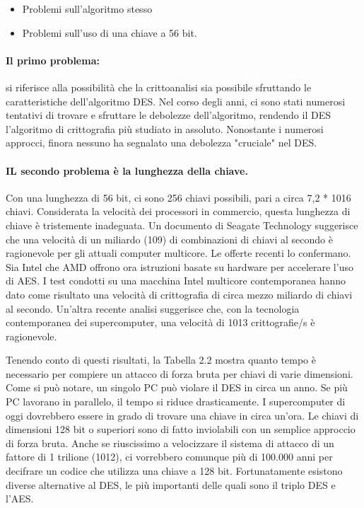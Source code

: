 \begin{itemize}
    \item Problemi sull'algoritmo stesso
    
    \item Problemi sull'uso di una chiave a 56 bit. 
\end{itemize}
\paragraph{Il primo problema:} si riferisce alla possibilità che la crittoanalisi sia possibile sfruttando le caratteristiche dell'algoritmo DES. Nel corso degli anni, ci sono stati numerosi tentativi di trovare e sfruttare le debolezze dell'algoritmo, rendendo il DES l'algoritmo di crittografia più studiato in assoluto. Nonostante i numerosi approcci, finora nessuno ha segnalato una debolezza "cruciale" nel DES.

\singlespacing

\paragraph{IL secondo problema è la lunghezza della chiave.} Con una lunghezza di 56 bit, ci sono 256 chiavi possibili, pari a circa 7,2 * 1016 chiavi. Considerata la velocità dei processori in commercio, questa lunghezza di chiave è tristemente inadeguata. Un documento di Seagate Technology suggerisce che una velocità di un miliardo (109) di combinazioni di chiavi al secondo è ragionevole per gli attuali computer multicore. Le offerte recenti lo confermano. Sia Intel che AMD offrono ora istruzioni basate su hardware per accelerare l'uso di AES. I test condotti su una macchina Intel multicore contemporanea hanno dato come risultato una velocità di crittografia di circa mezzo miliardo di chiavi al secondo. Un'altra recente analisi suggerisce che, con la tecnologia contemporanea dei supercomputer, una velocità di 1013 crittografie/s è ragionevole.

\singlespacing

Tenendo conto di questi risultati, la Tabella 2.2 mostra quanto tempo è necessario per compiere un attacco di forza bruta per chiavi di varie dimensioni. Come si può notare, un singolo PC può violare il DES in circa un anno. Se più PC lavorano in parallelo, il tempo si riduce drasticamente. I supercomputer di oggi dovrebbero essere in grado di trovare una chiave in circa un'ora. Le chiavi di dimensioni 128 bit o superiori sono di fatto inviolabili con un semplice approccio di forza bruta. Anche se riuscissimo a velocizzare il sistema di attacco di un fattore di 1 trilione (1012), ci vorrebbero comunque più di 100.000 anni per decifrare un codice che utilizza una chiave a 128 bit. Fortunatamente esistono diverse alternative al DES, le più importanti delle quali sono il triplo DES e l'AES.

